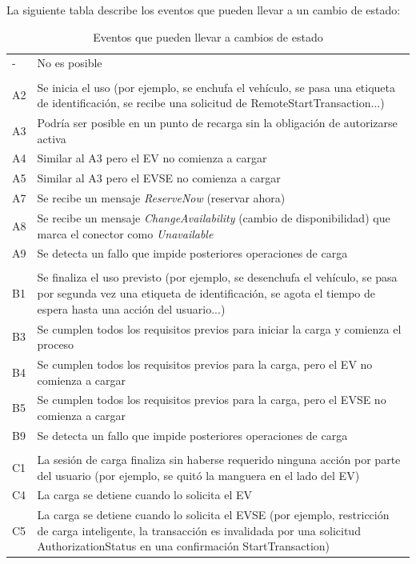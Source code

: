 \documentclass[12pt,a4paper,onecolumn,oneside]{report}
\begin{document}
La siguiente tabla describe los eventos que pueden llevar a un cambio de estado:

\begin{longtable}{|p{1cm}|p{14cm}|}
\caption{Eventos que pueden llevar a cambios de estado}
\label{Eventos que pueden llevar a cambios de estado}
\endfirsthead
\endhead
\hline
- & No es posible \\ 
 & \\
A2 & Se inicia el uso (por ejemplo, se enchufa el vehículo, se pasa una etiqueta de identificación, se recibe una solicitud de RemoteStartTransaction...) \\ 
A3 & Podría ser posible en un punto de recarga sin la obligación de autorizarse activa \\ 
A4 & Similar al A3 pero el EV no comienza a cargar \\ 
A5 & Similar al A3 pero el EVSE no comienza a cargar \\ 
A7 & Se recibe un mensaje \textit{ReserveNow} (reservar ahora) \\ 
A8 & Se recibe un mensaje \textit{ChangeAvailability} (cambio de disponibilidad) que marca el conector como \textit{Unavailable} \\
A9 & Se detecta un fallo que impide posteriores operaciones de carga \\ 
 & \\
B1 & Se finaliza el uso previsto (por ejemplo, se desenchufa el vehículo, se pasa por segunda vez una etiqueta de identificación, se agota el tiempo de espera hasta una acción del usuario...) \\
B3 & Se cumplen todos los requisitos previos para iniciar la carga y comienza el proceso\\
B4 & Se cumplen todos los requisitos previos para la carga, pero el EV no comienza a cargar \\
B5 & Se cumplen todos los requisitos previos para la carga, pero el EVSE no comienza a cargar \\
B9 & Se detecta un fallo que impide posteriores operaciones de carga \\
 & \\
C1 & La sesión de carga finaliza sin haberse requerido ninguna acción por parte del usuario (por ejemplo, se quitó la manguera en el lado del EV)\\
C4 & La carga se detiene cuando lo solicita el EV\\
C5 & La carga se detiene cuando lo solicita el EVSE (por ejemplo, restricción de carga inteligente, la transacción es invalidada por una solicitud AuthorizationStatus en una confirmación StartTransaction)\\

\end{longtable}
\end{document}
